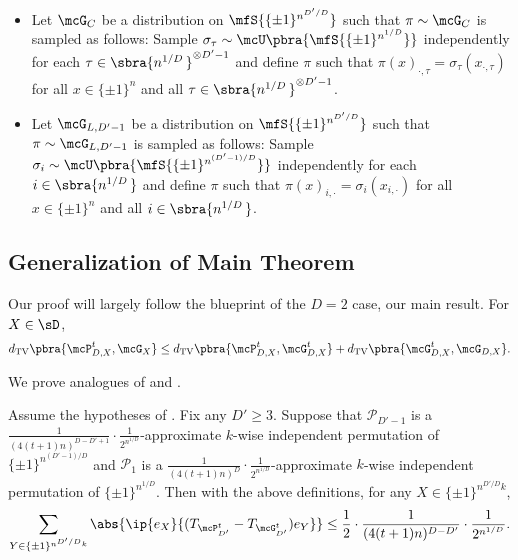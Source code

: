 \begin{itemize}
    \item Let $\mcG_C$ be a distribution on $\mfS{\{\pm1\}^{n^{D'/D}}}$ such that $\pi \sim \mcG_C$ is sampled as follows: 
          Sample $\sigma_\tau \sim \mcU\pbra{\mfS{\{\pm1\}^{n^{1/D}}}}$ independently for each $\tau \in \sbra{n^{1/D}\,}^{\otimes D'-1}$ and define $\pi$ such that $\pi(x)_{\cdot, \tau} = \sigma_\tau(x_{\cdot, \tau})$ for all $x \in \{\pm1\}^{n}$ and all $\tau \in \sbra{n^{1/D}\,}^{\otimes D'-1}$. 
    \item Let $\mcG_{L, D'-1}$ be a distribution on $\mfS{\{\pm1\}^{n^{D'/D}}}$ such that $\pi \sim \mcG_{L, D'-1}$ is sampled as follows: 
          Sample $\sigma_i \sim \mcU\pbra{\mfS{\{\pm1\}^{n^{(D'-1)/D}}}}$ independently for each $i \in \sbra{n^{1/D}\,}$ and define $\pi$ such that $\pi(x)_{i, \cdot} = \sigma_i(x_{i, \cdot})$ for all $x \in \{\pm1\}^{n}$ and all $i \in \sbra{n^{1/D}\,}$. 
\end{itemize}

\subsection{Generalization of Main Theorem}

Our proof will largely follow the blueprint of the $D = 2$ case, our main result. For $X\in\sD$,
\begin{equation*}
    d_{\textrm{TV}}\pbra{\mcP^t_{D, X}, \mcG_X} \leq d_{\textrm{TV}}\pbra{\mcP^t_{D,X}, \mcG^t_{D,X}} + d_{\textrm{TV}}\pbra{\mcG^t_{D, X}, \mcG_{D, X}}.
\end{equation*}

We prove analogues of  and . 
\begin{lemma}
    \label{lem:genreduction}
    Assume the hypotheses of . Fix any $D'\geq 3$. Suppose that $\mathcal{P}_{D'-1}$ is a $\frac{1}{(4(t+1)n)^{D-D'+1}} \cdot \frac1{2^{n^{1/D}}}$-approximate $k$-wise independent permutation of $\{\pm1\}^{n^{(D'-1)/D}}$ and $\mathcal{P}_1$ is a $\frac1{(4(t+1)n)^{D}}\cdot\frac1{2^{n^{1/D}}}$-approximate $k$-wise independent permutation of $\{\pm1\}^{n^{1/D}}$. Then with the above definitions, for any $X \in \{\pm1\}^{n^{D'/D}k}$,
    \begin{equation*}
        \sum_{Y \in \{\pm1\}^{n^{D'/D}k}} \abs{\ip{e_X}{(T_{\mcP_{D'}^t}-T_{\mcG^t_{D'}}) e_Y}} \leq  \frac12\cdot \frac1{(4(t+1)n)^{D-D'}}\cdot\frac1{2^{n^{1/D}}}.
    \end{equation*}
\end{lemma}

